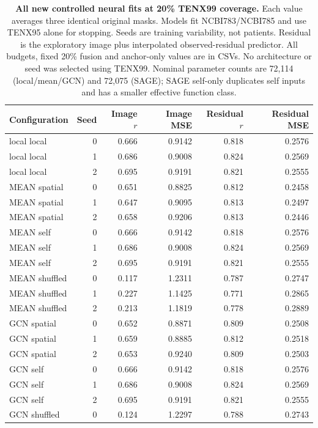 \begin{table}[!htbp]
\caption{\textbf{All new controlled neural fits at 20\% TENX99 coverage.} Each value averages three identical original masks. Models fit NCBI783/NCBI785 and use TENX95 alone for stopping. Seeds are training variability, not patients. Residual is the exploratory image plus interpolated observed-residual predictor. All budgets, fixed 20\% fusion and anchor-only values are in CSVs. No architecture or seed was selected using TENX99. Nominal parameter counts are 72,114 (local/mean/GCN) and 72,075 (SAGE); SAGE self-only duplicates self inputs and has a smaller effective function class.}
\label{tab:journal_neural}
\centering\footnotesize
\begin{tabular}{@{}lrrrrr@{}}
\toprule
Configuration & Seed & Image $r$ & Image MSE & Residual $r$ & Residual MSE \\
\midrule
local local & 0 & 0.666 & 0.9142 & 0.818 & 0.2576 \\
local local & 1 & 0.686 & 0.9008 & 0.824 & 0.2569 \\
local local & 2 & 0.695 & 0.9191 & 0.821 & 0.2555 \\
MEAN spatial & 0 & 0.651 & 0.8825 & 0.812 & 0.2458 \\
MEAN spatial & 1 & 0.647 & 0.9095 & 0.813 & 0.2497 \\
MEAN spatial & 2 & 0.658 & 0.9206 & 0.813 & 0.2446 \\
MEAN self & 0 & 0.666 & 0.9142 & 0.818 & 0.2576 \\
MEAN self & 1 & 0.686 & 0.9008 & 0.824 & 0.2569 \\
MEAN self & 2 & 0.695 & 0.9191 & 0.821 & 0.2555 \\
MEAN shuffled & 0 & 0.117 & 1.2311 & 0.787 & 0.2747 \\
MEAN shuffled & 1 & 0.227 & 1.1425 & 0.771 & 0.2865 \\
MEAN shuffled & 2 & 0.213 & 1.1819 & 0.778 & 0.2889 \\
GCN spatial & 0 & 0.652 & 0.8871 & 0.809 & 0.2508 \\
GCN spatial & 1 & 0.659 & 0.8885 & 0.812 & 0.2518 \\
GCN spatial & 2 & 0.653 & 0.9240 & 0.809 & 0.2503 \\
GCN self & 0 & 0.666 & 0.9142 & 0.818 & 0.2576 \\
GCN self & 1 & 0.686 & 0.9008 & 0.824 & 0.2569 \\
GCN self & 2 & 0.695 & 0.9191 & 0.821 & 0.2555 \\
GCN shuffled & 0 & 0.124 & 1.2297 & 0.788 & 0.2743 \\

\end{tabular}
\end{table}
